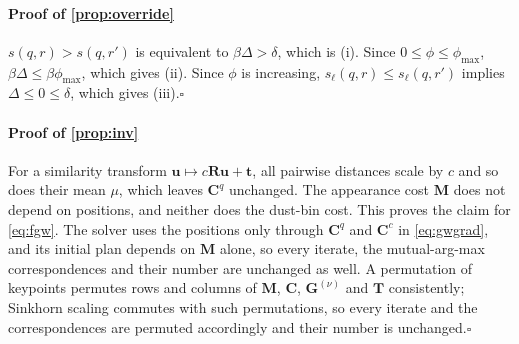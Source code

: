 \paragraph*{Proof of \cref{prop:override}}
$s(q,r)>s(q,r')$ is equivalent to $\beta\Delta>\delta$, which is (i). Since $0\le\phi\le\phi_{\max}$,
$\beta\Delta\le\beta\phi_{\max}$, which gives (ii). Since $\phi$ is increasing,
$s_\ell(q,r)\le s_\ell(q,r')$ implies $\Delta\le0\le\delta$, which gives (iii).\hfill$\square$

\paragraph*{Proof of \cref{prop:inv}}
For a similarity transform $\mathbf{u}\mapsto c\mathbf{R}\mathbf{u}+\mathbf{t}$, all pairwise distances
scale by $c$ and so does their mean $\mu$, which leaves $\mathbf{C}^{q}$ unchanged. The appearance cost
$\mathbf{M}$ does not depend on positions, and neither does the dust-bin cost. This proves the claim
for \eqref{eq:fgw}. The solver uses the positions only through $\mathbf{C}^{q}$ and $\mathbf{C}^{c}$ in
\eqref{eq:gwgrad}, and its initial plan depends on $\mathbf{M}$ alone, so every iterate, the
mutual-arg-max correspondences and their number are unchanged as well. A permutation of keypoints
permutes rows and columns of $\mathbf{M}$, $\mathbf{C}$, $\mathbf{G}^{(\nu)}$ and $\mathbf{T}$
consistently; Sinkhorn scaling commutes with such permutations, so every iterate and the
correspondences are permuted accordingly and their number is unchanged.\hfill$\square$
